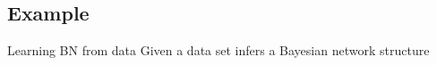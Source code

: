 \subsection{Example}
	
\begin{frame}[fragile]
	\begin{block}{Learning BN from data}
		Given a data set infers a Bayesian network structure
	\end{block}
	\begin{columns}
		\begin{column}{.6\linewidth}
			
		\end{column}
		\begin{column}{.4\linewidth}
			\begin{figure}
				\centering
				
			\end{figure}
		\end{column}
	\end{columns}
\end{frame}